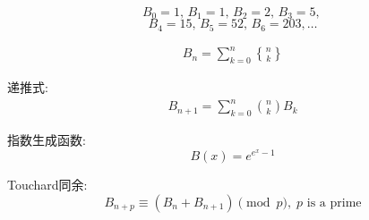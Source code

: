 $$B_0 = 1,\, B_1 = 1,\, B_2 = 2,\, B_3 = 5,\,$$
$$B_4 = 15,\, B_5 = 52,\, B_6 = 203, \dots$$

$$\begin{aligned}B_n = \sum_{k = 0} ^ n {n\brace k}\end{aligned}$$

递推式:
$$\begin{aligned}
B_{n + 1} = \sum_{k = 0} ^n {n\choose k} B_k
\end{aligned}$$

指数生成函数: $$B(x) = e^{e^x - 1}$$

Touchard同余: $$B_{n + p} \equiv (B_n + B_{n + 1}) \pmod p,\;p \text{ is a prime}$$